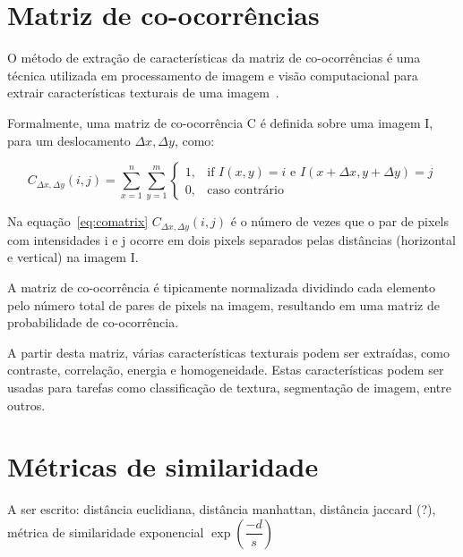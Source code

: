 \section{Matriz de co-ocorrências}\label{sec:teorica-matriz-co-ocorrencia}

O método de extração de características da matriz de co-ocorrências é
uma técnica utilizada em processamento de imagem e visão computacional
para extrair características texturais de uma imagem~\cite{matrizcoocorrencia2017}.

Formalmente, uma matriz de co-ocorrência C é definida sobre uma imagem
I, para um deslocamento $\Delta x, \Delta y$, como:

\begin{equation}\label{eq:comatrix}
C_{\Delta x, \Delta y}(i,j) = \sum_{x=1}^n\sum_{y=1}^m\begin{cases} 1, & \text{if }I(x,
                                                       y)=i\text{ e
                                                       }I(x+\Delta x, y+\Delta
                                                       y)=j \\ 0, &
                                                                    \text{caso contrário}\end{cases}
\end{equation}

Na equação~\ref{eq:comatrix} $C_{\Delta x, \Delta y}(i,j)$ é o número de vezes
que o par de pixels com intensidades i e j ocorre em dois pixels
separados pelas distâncias (horizontal e vertical) na imagem I.

A matriz de co-ocorrência é tipicamente normalizada dividindo cada
elemento pelo número total de pares de pixels na imagem, resultando em
uma matriz de probabilidade de co-ocorrência.

A partir desta matriz, várias características texturais podem ser
extraídas, como contraste, correlação, energia e homogeneidade. Estas
características podem ser usadas para tarefas como classificação de
textura, segmentação de imagem, entre outros.


\section{Métricas de similaridade}\label{sec:teorica-metricas-de-similaridade}

A ser escrito: distância euclidiana, distância manhattan, distância
jaccard (?), métrica de similaridade exponencial $\exp(\dfrac{-d}{s})$

